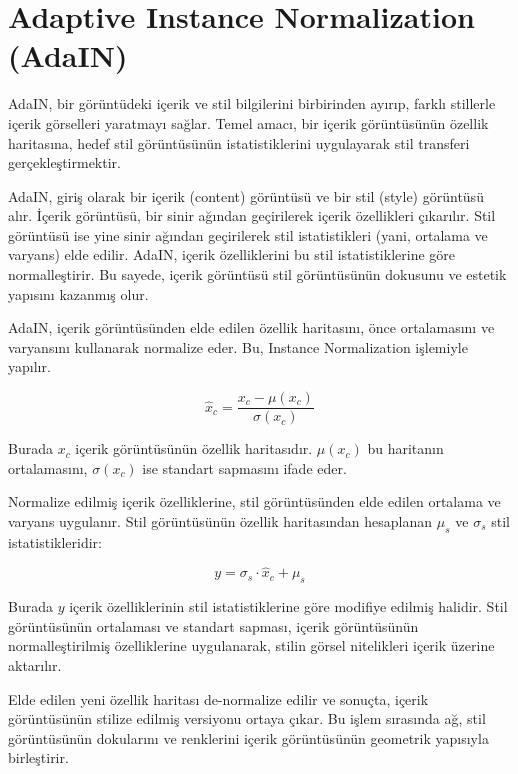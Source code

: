 \section{Adaptive Instance Normalization (AdaIN)}

AdaIN, bir görüntüdeki içerik ve stil bilgilerini birbirinden ayırıp, farklı stillerle içerik görselleri yaratmayı sağlar. Temel amacı, bir içerik görüntüsünün özellik haritasına, hedef stil görüntüsünün istatistiklerini uygulayarak stil transferi gerçekleştirmektir.

AdaIN, giriş olarak bir içerik (content) görüntüsü ve bir stil (style) görüntüsü alır. İçerik görüntüsü, bir sinir ağından geçirilerek içerik özellikleri çıkarılır. Stil görüntüsü ise yine sinir ağından geçirilerek stil istatistikleri (yani, ortalama ve varyans) elde edilir. AdaIN, içerik özelliklerini bu stil istatistiklerine göre normalleştirir. Bu sayede, içerik görüntüsü stil görüntüsünün dokusunu ve estetik yapısını kazanmış olur.

AdaIN, içerik görüntüsünden elde edilen özellik haritasını, önce ortalamasını ve varyansını kullanarak normalize eder. Bu, Instance Normalization işlemiyle yapılır.

\[ \hat{x}_c = \frac{x_c - \mu (x_c)}{\sigma (x_c)} \]

Burada $x_c$ içerik görüntüsünün özellik haritasıdır. $\mu (x_c)$ bu haritanın ortalamasını, $\sigma (x_c)$ ise standart sapmasını ifade eder.

Normalize edilmiş içerik özelliklerine, stil görüntüsünden elde edilen ortalama ve varyans uygulanır. Stil görüntüsünün özellik haritasından hesaplanan $\mu_s$ ve $\sigma_s$ stil istatistikleridir:

\[ y = \sigma_s \cdot \hat{x}_c + \mu_s \]

Burada $y$ içerik özelliklerinin stil istatistiklerine göre modifiye edilmiş halidir. Stil görüntüsünün ortalaması ve standart sapması, içerik görüntüsünün normalleştirilmiş özelliklerine uygulanarak, stilin görsel nitelikleri içerik üzerine aktarılır.

Elde edilen yeni özellik haritası de-normalize edilir ve sonuçta, içerik görüntüsünün stilize edilmiş versiyonu ortaya çıkar. Bu işlem sırasında ağ, stil görüntüsünün dokularını ve renklerini içerik görüntüsünün geometrik yapısıyla birleştirir.

\newpage